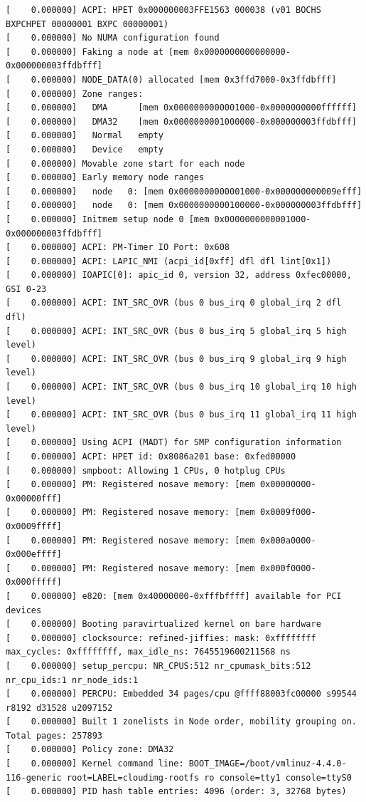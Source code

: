 \documentclass[12pt]{article}
\begin{document}
\begin{verbatim}
[    0.000000] ACPI: HPET 0x000000003FFE1563 000038 (v01 BOCHS  BXPCHPET 00000001 BXPC 00000001)
[    0.000000] No NUMA configuration found
[    0.000000] Faking a node at [mem 0x0000000000000000-0x000000003ffdbfff]
[    0.000000] NODE_DATA(0) allocated [mem 0x3ffd7000-0x3ffdbfff]
[    0.000000] Zone ranges:
[    0.000000]   DMA      [mem 0x0000000000001000-0x0000000000ffffff]
[    0.000000]   DMA32    [mem 0x0000000001000000-0x000000003ffdbfff]
[    0.000000]   Normal   empty
[    0.000000]   Device   empty
[    0.000000] Movable zone start for each node
[    0.000000] Early memory node ranges
[    0.000000]   node   0: [mem 0x0000000000001000-0x000000000009efff]
[    0.000000]   node   0: [mem 0x0000000000100000-0x000000003ffdbfff]
[    0.000000] Initmem setup node 0 [mem 0x0000000000001000-0x000000003ffdbfff]
[    0.000000] ACPI: PM-Timer IO Port: 0x608
[    0.000000] ACPI: LAPIC_NMI (acpi_id[0xff] dfl dfl lint[0x1])
[    0.000000] IOAPIC[0]: apic_id 0, version 32, address 0xfec00000, GSI 0-23
[    0.000000] ACPI: INT_SRC_OVR (bus 0 bus_irq 0 global_irq 2 dfl dfl)
[    0.000000] ACPI: INT_SRC_OVR (bus 0 bus_irq 5 global_irq 5 high level)
[    0.000000] ACPI: INT_SRC_OVR (bus 0 bus_irq 9 global_irq 9 high level)
[    0.000000] ACPI: INT_SRC_OVR (bus 0 bus_irq 10 global_irq 10 high level)
[    0.000000] ACPI: INT_SRC_OVR (bus 0 bus_irq 11 global_irq 11 high level)
[    0.000000] Using ACPI (MADT) for SMP configuration information
[    0.000000] ACPI: HPET id: 0x8086a201 base: 0xfed00000
[    0.000000] smpboot: Allowing 1 CPUs, 0 hotplug CPUs
[    0.000000] PM: Registered nosave memory: [mem 0x00000000-0x00000fff]
[    0.000000] PM: Registered nosave memory: [mem 0x0009f000-0x0009ffff]
[    0.000000] PM: Registered nosave memory: [mem 0x000a0000-0x000effff]
[    0.000000] PM: Registered nosave memory: [mem 0x000f0000-0x000fffff]
[    0.000000] e820: [mem 0x40000000-0xfffbffff] available for PCI devices
[    0.000000] Booting paravirtualized kernel on bare hardware
[    0.000000] clocksource: refined-jiffies: mask: 0xffffffff max_cycles: 0xffffffff, max_idle_ns: 7645519600211568 ns
[    0.000000] setup_percpu: NR_CPUS:512 nr_cpumask_bits:512 nr_cpu_ids:1 nr_node_ids:1
[    0.000000] PERCPU: Embedded 34 pages/cpu @ffff88003fc00000 s99544 r8192 d31528 u2097152
[    0.000000] Built 1 zonelists in Node order, mobility grouping on.  Total pages: 257893
[    0.000000] Policy zone: DMA32
[    0.000000] Kernel command line: BOOT_IMAGE=/boot/vmlinuz-4.4.0-116-generic root=LABEL=cloudimg-rootfs ro console=tty1 console=ttyS0
[    0.000000] PID hash table entries: 4096 (order: 3, 32768 bytes)

\end{verbatim}
\end{document}

